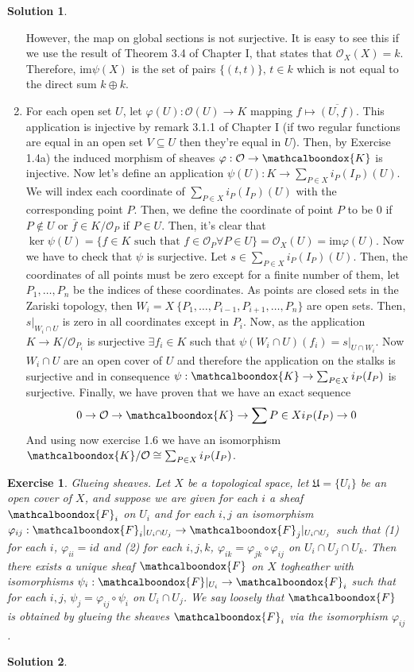 \documentclass[12pt]{article}
\newcommand{\ima}{\ensuremath{\mathrm{im}}}
\newcommand{\locO}{\ensuremath{\mathcal{O}}}
\newtheorem{ex}{Exercise}[section]
\theoremstyle{definition}
\newtheorem*{sol}{Solution}
\newcommand{\sF}{\ensuremath{\mathcalboondox{F}}}
\begin{document}
\begin{sol}
\begin{enumerate}[label = \alph*)]
		However, the map on global sections is not surjective. It is easy to see this if we use the result of Theorem 3.4 of Chapter I, that states that $\locO_X(X) = k$. Therefore, $\ima \psi(X)$ is the set of pairs $\{(t,t)\}, \, t \in k$ which is not equal to the direct sum $k \oplus k$.

		\item For each open set $U$, let $\varphi(U): \locO(U) \to K$ mapping $f \mapsto \overline{(U,f)}$. This application is injective by remark 3.1.1 of Chapter I (if two regular functions are equal in an open set $V \subseteq U$ then they're equal in $U$). Then, by Exercise 1.4a) the induced morphism of sheaves $\varphi: \locO \to \mathcalboondox{K}$ is injective. Now let's define an application $\psi(U): K \to \sum_{P \in X} i_P(I_P)(U)$. We will index each coordinate of $\sum_{P \in X} i_P(I_P)(U)$ with the corresponding point $P$. Then, we define the coordinate of point $P$ to be 0 if $P \notin U$ or $\overline{f} \in K/\locO_P$ if $P \in U$. Then, it's clear that $\ker \psi(U) = \{f \in K \text{ such that } f \in \locO_P \forall P \in U\} = \locO_X(U)= \ima \varphi(U)$. Now we have to check that $\psi$ is surjective. Let $s \in \sum_{P \in X} i_P(I_P) (U)$. Then, the coordinates of all points must be zero except for a finite number of them, let $P_1, \dots, P_n$ be the indices of these coordinates. As points are closed sets in the Zariski topology, then $W_i = X \ \{P_1, \dots, P_{i-1}, P_{i+1}, \dots, P_n \}$ are open sets. Then, $s|_{W_i \cap U}$ is zero in all coordinates except in $P_i$. Now, as the application $K \to K/\locO_{P_i}$ is surjective $\exists f_i \in K$ such that $\psi(W_i \cap U)(f_i) = s|_{U \cap W_i}$. Now $W_i \cap U$ are an open cover of $U$ and therefore the application on the stalks is surjective and in consequence $\psi: \mathcalboondox{K} \to \sum_{P \in X} i_P(I_P)$ is surjective. Finally, we have proven that we have an exact sequence 
		\[
			0 \to \locO \to \mathcalboondox{K} \to \sum{P \in X}i_P(I_P) \to 0
		\]
		And using now exercise 1.6 we have an isomorphism $\mathcalboondox{K}/\locO \cong \sum_{P \in X}i_P(I_P)$.

	\end{enumerate}
\end{sol}

\begin{ex}
	Glueing sheaves. Let $X$ be a topological space, let $\mathfrak{U} = \{U_i\}$ be an open cover of $X$, and suppose we are given for each $i$ a sheaf $\sF_i$ on $U_i$ and for each $i,j$ an isomorphism $\varphi_{ij}: \sF_i|_{U_i \cap U_j} \to \sF_j|_{U_i \cap U_j}$ such that (1) for each $i$, $\varphi_{ii} = id$ and (2) for each $i,j,k$, $\varphi_{ik} = \varphi_{jk} \circ \varphi_{ij}$ on $U_i \cap U_j \cap U_k$. Then there exists a unique sheaf $\sF$ on $X$ togheather with isomorphisms $\psi_i: \sF|_{U_i} \to \sF_i$ such that for each $i,j, \, \psi_j = \varphi_{ij} \circ \psi_i$ on $U_i \cap U_j$. We say loosely that $\sF$ is obtained by glueing the sheaves $\sF_i$ via the isomorphism $\varphi_{ij}$.
\end{ex}

\begin{sol}

\end{sol}
\end{document}
